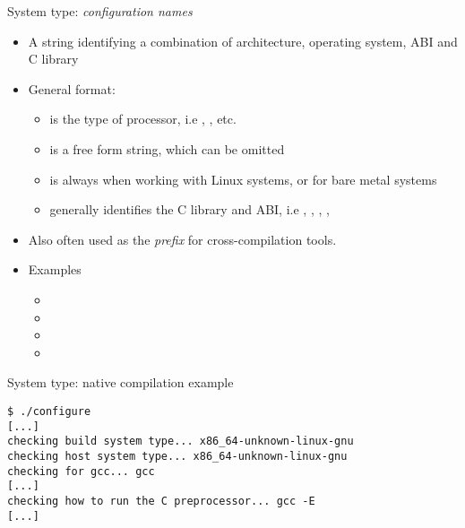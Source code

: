 \begin{frame}{System type: {\em configuration names}}
  \begin{itemize}
  \item A string identifying a combination of architecture, operating
    system, ABI and C library
  \item General format: 
    \begin{itemize}
    \item {} is the type of processor, i.e ,
      , etc.
    \item {} is a free form string, which can be omitted
    \item {} is always  when working with
      Linux systems, or  for bare metal systems
    \item {} generally identifies the C library
      and ABI, i.e , , ,
      , 
    \end{itemize}
  \item Also often used as the {\em prefix} for cross-compilation
    tools.
  \item Examples
    \begin{itemize}
    \item {}
    \item {}
    \item {}
    \item {}
    \end{itemize}
  \end{itemize}
\end{frame}

\begin{frame}[fragile]{System type: native compilation example}

\begin{block}{}
{\small
\begin{verbatim}
$ ./configure
[...]
checking build system type... x86_64-unknown-linux-gnu
checking host system type... x86_64-unknown-linux-gnu
checking for gcc... gcc
[...]
checking how to run the C preprocessor... gcc -E
[...]
\end{verbatim}}
\end{block}

\end{frame}

